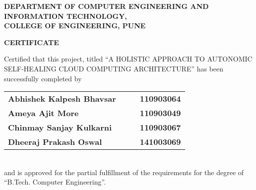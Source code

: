 % 
\thispagestyle{empty}
\linespread{2}
\begin{center}			%
	\Large{\bf{DEPARTMENT OF COMPUTER ENGINEERING AND\\  INFORMATION TECHNOLOGY,\\ 
	       COLLEGE OF ENGINEERING, PUNE\\}}	
\end{center}

\vspace{20pt}			%

\begin{center}
	\Large{\bf{CERTIFICATE\\}}
\end{center}

\vspace{20pt}

\linespread{2}			%
\selectfont
\large{
Certified that this project, titled ``A HOLISTIC APPROACH TO AUTONOMIC SELF-HEALING CLOUD COMPUTING ARCHITECTURE''
has been successfully completed by \\ 
\begin{table}[htbp]
	\begin{center}
	\begin{tabular}{ l c c l }
	\Large\bf{Abhishek Kalpesh Bhavsar} & & & \Large\bf{110903064} \\[0.3cm] 
	\Large\bf{Ameya Ajit More} & & & \Large\bf{110903049} \\[0.3cm] 
	\Large\bf{Chinmay Sanjay Kulkarni} & & & \Large\bf{110903067} \\[0.3cm] 
	\Large\bf{Dheeraj Prakash Oswal} & & & \Large\bf{141003069} \\
	\end{tabular}
	\end{center}
	\end{table} \\
and is approved for the partial fulfillment of the requirements for the degree of 
``B.Tech. Computer Engineering''.
}

\vspace{20pt}


